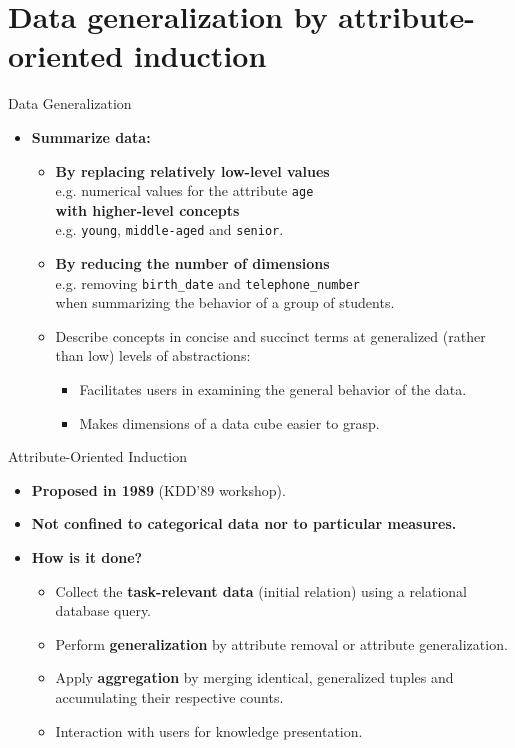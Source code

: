 \section{Data generalization by attribute-oriented induction}

\begin{frame}{Data Generalization}
  \begin{itemize}
  \item \textbf{Summarize data:}
    \begin{itemize}
    \item \textbf{By replacing relatively low-level values} \\
      e.g. numerical values for the attribute \texttt{age} \\
      \textbf{with higher-level concepts}\\
      e.g. \texttt{young}, \texttt{middle-aged} and \texttt{senior}.
    \item \textbf{By reducing the number of dimensions}\\
      e.g. removing \texttt{birth\_date} and \texttt{telephone\_number} \\ when summarizing the behavior of a group of students.
    \item Describe concepts in concise and succinct terms at generalized (rather than low) levels of abstractions:
      \begin{itemize}
      \item Facilitates users in examining the general behavior of the data.
      \item Makes dimensions of a data cube easier to grasp.
      \end{itemize}
    \end{itemize}
  \end{itemize}
\end{frame}

\begin{frame}{Attribute-Oriented Induction}
  \begin{itemize}
  \item \textbf{Proposed in 1989} (KDD'89 workshop).
  \item \textbf{Not confined to categorical data nor to particular measures.}
  \item \textbf{How is it done?}
    \begin{itemize}
    \item Collect the \textbf{\color{airforceblue}task-relevant data} (initial relation) using a relational database query.
    \item Perform \textbf{\color{airforceblue}generalization} by attribute removal or attribute generalization.
    \item Apply \textbf{\color{airforceblue}aggregation} by merging identical, generalized tuples and \\ accumulating their respective counts.
    \item Interaction with users for knowledge presentation.
    \end{itemize}
  \end{itemize}
\end{frame}

